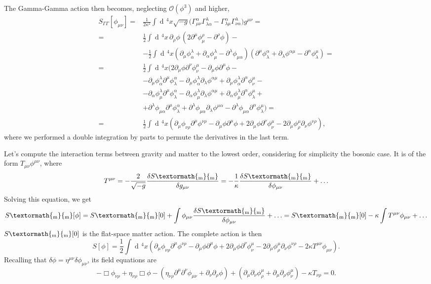 \documentclass[a4paper,12pt]{book}
\newcommand{\ped}[1]{\textormath{\textsubscript{#1}}{_{\mathrm{#1}}}}
\newcommand{\dd}{\mathop{\mathrm{d}\!}{}}
\theoremstyle{definition}
\theoremstyle{remark}
\begin{document}
The Gamma-Gamma action then becomes, neglecting $\mathcal O(\phi^3)$ and higher,
\begin{align*}
S_{\Gamma\Gamma}[\phi_{\mu\nu}]={}&\frac1{2\kappa^2}\int\dd^4x\sqrt{-g}\bigl(\Gamma^\alpha_{\mu\nu}\Gamma^\lambda_{\lambda\alpha}-\Gamma^\alpha_{\lambda\mu}\Gamma^\lambda_{\nu\alpha}\bigr)g^{\mu\nu}=\\
={}&\frac12\int\dd^4x\,\partial_\rho\phi\,(2\partial^\mu\phi^\rho_\mu-\partial^\rho\phi)-{}\\
&-\frac12\int\dd^4x(\partial_\mu\phi^\lambda_\alpha+\partial_\alpha\phi^\lambda_\mu-\partial^\lambda\phi_{\mu\alpha})(\partial^\mu\phi^\alpha_\lambda+\partial_\lambda\phi^{\alpha\mu}-\partial^\alpha\phi_\lambda^\mu)=\\
={}&\frac12\int\dd^4x(2\partial_\mu\phi\partial^\nu\phi^\mu_\nu-\partial_\mu\phi\partial^\mu\phi-{}\\
&-\partial_\mu\phi^\lambda_\alpha\partial^\mu\phi^\alpha_\lambda-\partial_\mu\phi^\lambda_\alpha\partial_\lambda\phi^{\alpha\mu}+\partial_\mu\phi^\lambda_\alpha\partial^\alpha\phi^\mu_\nu-{}\\
&-\partial_\alpha\phi^\lambda_\mu\partial^\mu\phi^\alpha_\lambda-\partial_\alpha\phi^\lambda_\mu\partial_\lambda\phi^{\alpha\mu}+\partial_\alpha\phi^\lambda_\mu\partial^\alpha\phi^\mu_\lambda+{}\\
&+\partial^\lambda\phi_{\mu\alpha}\partial^\mu\phi^\alpha_\lambda+\partial^\lambda\phi_{\mu\alpha}\partial_\lambda\phi^{\mu\alpha}-\partial^\lambda\phi_{\mu\alpha}\partial^\alpha\phi^\mu_\lambda)=\\
={}&\frac12\int\dd^4x(\partial_\mu\phi_{\nu\rho}\partial^\mu\phi^{\nu\rho}-\partial_\mu\phi\partial^\mu\phi+2\partial_\mu\phi\partial^\nu\phi^\mu_\nu-2\partial_\mu\phi^\mu_\rho\partial_\nu\phi^{\nu\rho}),
\end{align*}
where we performed a double integration by parts to permute the derivatives in the last term.

Let's compute the interaction terms between gravity and matter to the lowest order, considering for simplicity the bosonic case. It is of the form $T_{\mu\nu}\phi^{\mu\nu}$, where
\[T^{\mu\nu}=-\frac2{\sqrt{-g}}\frac{\delta S\ped{m}}{\delta g_{\mu\nu}}=-\frac1\kappa\frac{\delta S\ped{m}}{\delta\phi_{\mu\nu}}+\ldots\]
Solving this equation, we get
\[S\ped{m}[\phi]=S\ped{m}[0]+\int\phi_{\mu\nu}\frac{\delta S\ped{m}}{\delta\phi_{\mu\nu}}+\ldots=S\ped{m}[0]-\kappa\int T^{\mu\nu}\phi_{\mu\nu}+\ldots\]
$S\ped{m}[0]$ is the flat-space matter action. The complete action is then
\[S[\phi]=\frac12\int\dd^4x(\partial_\mu\phi_{\nu\rho}\partial^\mu\phi^{\nu\rho}-\partial_\mu\phi\partial^\mu\phi+2\partial_\mu\phi\partial^\nu\phi^\mu_\nu-2\partial_\mu\phi^\mu_\rho\partial_\nu\phi^{\nu\rho}-2\kappa T^{\mu\nu}\phi_{\mu\nu}).\]
Recalling that $\delta\phi=\eta^{\mu\nu}\delta\phi_{\mu\nu}$, its field equations are
\[-\Box\phi_{\nu\rho}+\eta_{\nu\rho}\Box\phi-(\eta_{\nu\rho}\partial^\mu\partial^\nu\phi_{\mu\nu}+\partial_\nu\partial_\rho\phi)+(\partial_\mu\partial_\nu\phi^\mu_\rho+\partial_\mu\partial_\rho\phi^\mu_\nu)-\kappa T_{\nu\rho}=0.\]
\end{document}
